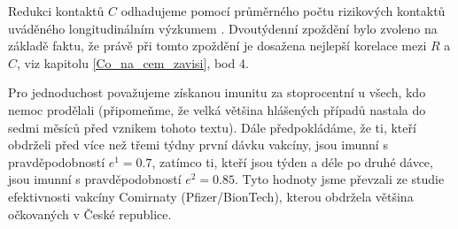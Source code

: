 Redukci kontaktů $C$ odhadujeme pomocí průměrného počtu rizikových
kontaktů uváděného longitudinálním výzkumem \cite{paqcovid}. Dvoutýdenní zpoždění bylo zvoleno na základě faktu, že právě při tomto zpoždění je dosažena nejlepší korelace mezi $R$ a $C$, viz kapitolu \ref{Co_na_cem_zavisi}, bod 4. 

Pro jednoduchost považujeme získanou imunitu za stoprocentní u všech,
kdo nemoc prodělali (připomeňme, že velká většina hlášených případů
nastala do sedmi měsíců před vznikem tohoto textu). Dále předpokládáme,
že ti, kteří obdrželi před více než třemi týdny první dávku vakcíny,
jsou imunní s pravděpodobností $e^{1}=0.7$, zatímco ti, kteří jsou
týden a déle po druhé dávce, jsou imunní s pravděpodobností $e^{2}=0.85$.
Tyto hodnoty jsme převzali ze studie \cite{hall2021covid} efektivnosti
vakcíny Comirnaty (Pfizer/BionTech), kterou obdržela většina očkovaných
v České republice. 

